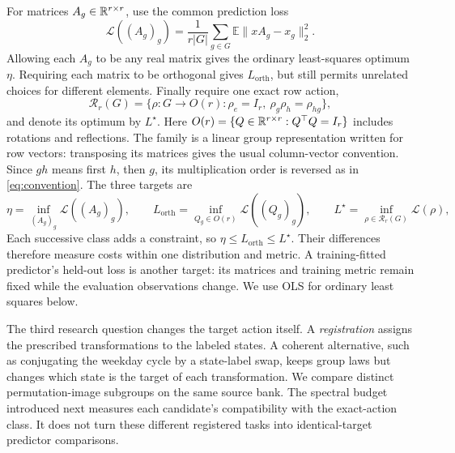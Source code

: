 For matrices $A_g\in\mathbb{R}^{r\times r}$, use the common prediction loss
\begin{equation}
 \mathcal L((A_g)_g)=\frac{1}{r|G|}\sum_{g\in G}
 \mathbb E\|xA_g-x_g\|_2^2.
 \label{eq:class-loss-main}
\end{equation}
Allowing each $A_g$ to be any real matrix gives the ordinary least-squares optimum $\eta$. Requiring each matrix to be orthogonal gives $L_{\mathrm{orth}}$, but still permits unrelated choices for different elements. Finally require one exact row action,
\[
 \mathcal R_r(G)=\{\rho:G\to O(r):\rho_e=I_r,\ \rho_g\rho_h=\rho_{hg}\},
\]
and denote its optimum by $L^\star$. Here $O(r)=\{Q\in\mathbb{R}^{r\times r}:Q^\top Q=I_r\}$ includes rotations and reflections. The family is a linear group representation written for row vectors: transposing its matrices gives the usual column-vector convention. Since $gh$ means first $h$, then $g$, its multiplication order is reversed as in \cref{eq:convention}. The three targets are
\[
 \eta=\inf_{(A_g)_g}\mathcal L((A_g)_g),\qquad
 L_{\mathrm{orth}}=\inf_{Q_g\in O(r)}\mathcal L((Q_g)_g),\qquad
 L^\star=\inf_{\rho\in\mathcal R_r(G)}\mathcal L(\rho),
\]
Each successive class adds a constraint, so $\eta\le L_{\mathrm{orth}}\le L^\star$. Their differences therefore measure costs within one distribution and metric. A training-fitted predictor's held-out loss is another target: its matrices and training metric remain fixed while the evaluation observations change. We use OLS for ordinary least squares below.

The third research question changes the target action itself. A \emph{registration} assigns the prescribed transformations to the labeled states. A coherent alternative, such as conjugating the weekday cycle by a state-label swap, keeps group laws but changes which state is the target of each transformation. We compare distinct permutation-image subgroups on the same source bank. The spectral budget introduced next measures each candidate's compatibility with the exact-action class. It does not turn these different registered tasks into identical-target predictor comparisons.

